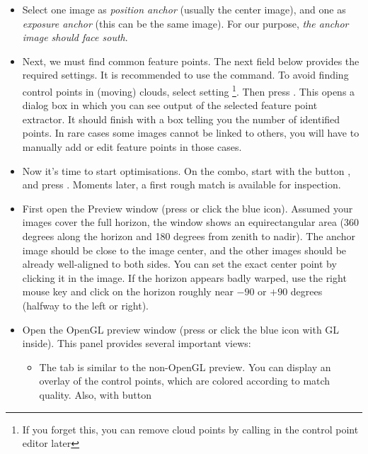\begin{itemize}
\item Select one image as \emph{position anchor} (usually the center
  image), and one as \emph{exposure anchor} (this can be the same
  image). For our purpose, \emph{the anchor image should face
    south}. 
\item Next, we must find common feature points. The next field below
  provides the required settings. It is recommended to use the 
  command. To avoid finding control points in (moving) clouds, select
  setting \footnote{If you forget this,
    you can remove cloud points by calling  in the control
    point editor later}. Then press . This
  opens a dialog box in which you can see output of the selected
  feature point extractor. It should finish with a box telling you the
  number of identified points. In rare cases some images cannot be
  linked to others, you will have to manually add or edit feature
  points in those cases.
\item Now it's time to start optimisations. On the  combo, start with the button , and press . Moments later, a first rough
  match is available for inspection.
\item First open the Preview window (press  or click the blue icon). Assumed
  your images cover the full horizon, the window shows an
  equirectangular area (360 degrees along the horizon and 180 degrees
  from zenith to nadir). The anchor image should be close to the image
  center, and the other images should be already well-aligned to both
  sides. You can set the exact center point by clicking it in the
  image. If the horizon appears badly warped, use the right mouse key and
  click on the horizon roughly near $-90$ or $+90$ degrees (halfway to
  the left or right).
\item Open the OpenGL preview window (press  or click the blue icon
  with GL inside). This panel provides several important views:
  \begin{itemize}
  \item The  tab is similar to the non-OpenGL preview. You can
    display an overlay of the control points, which are colored
    according to match quality. Also, with button 

\end{itemize}
\end{itemize}
